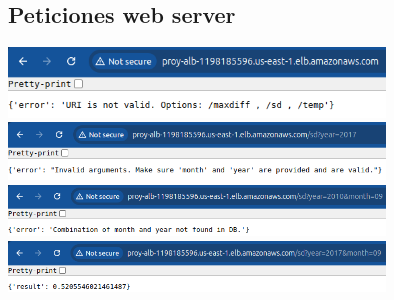 \subsection{Peticiones web server}

\begin{center}
     \includegraphics[width=0.75\textwidth]{img/noURI.png}
     \includegraphics[width=0.75\textwidth]{img/notValidArguments.png}
     \includegraphics[width=0.75\textwidth]{img/dataNotFound.png}
     \includegraphics[width=0.75\textwidth]{img/validArguments.png}
\end{center}